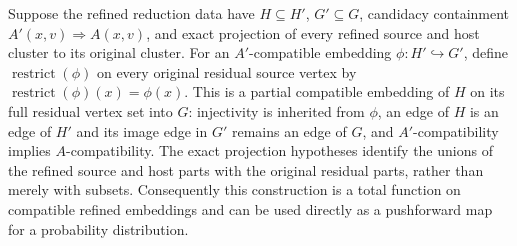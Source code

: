 \begin{definition}
Suppose the refined reduction data have $H\subseteq H'$, $G'\subseteq G$, candidacy containment $A'(x,v)\Rightarrow A(x,v)$, and exact projection of every refined source and host cluster to its original cluster.  For an $A'$-compatible embedding $\phi:H'\hookrightarrow G'$, define $\operatorname{restrict}(\phi)$ on every original residual source vertex by $\operatorname{restrict}(\phi)(x)=\phi(x)$.  This is a partial compatible embedding of $H$ on its full residual vertex set into $G$: injectivity is inherited from $\phi$, an edge of $H$ is an edge of $H'$ and its image edge in $G'$ remains an edge of $G$, and $A'$-compatibility implies $A$-compatibility.  The exact projection hypotheses identify the unions of the refined source and host parts with the original residual parts, rather than merely with subsets.  Consequently this construction is a total function on compatible refined embeddings and can be used directly as a pushforward map for a probability distribution.
\end{definition}
